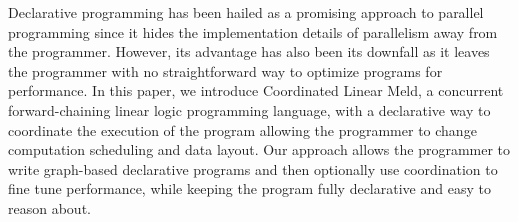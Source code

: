 Declarative programming has been hailed as a promising approach to parallel
programming since it hides the implementation details of parallelism away from
the programmer. However, its advantage has also been its downfall as it leaves
the programmer with no straightforward way to optimize programs for performance.
In this paper, we introduce Coordinated Linear Meld, a concurrent
forward-chaining linear logic programming language, with a declarative way to
coordinate the execution of the program allowing the programmer to change
computation scheduling and data layout. Our approach allows the programmer to
write graph-based declarative programs and then optionally use coordination to fine
tune performance, while keeping the program fully declarative and easy to reason
about.
